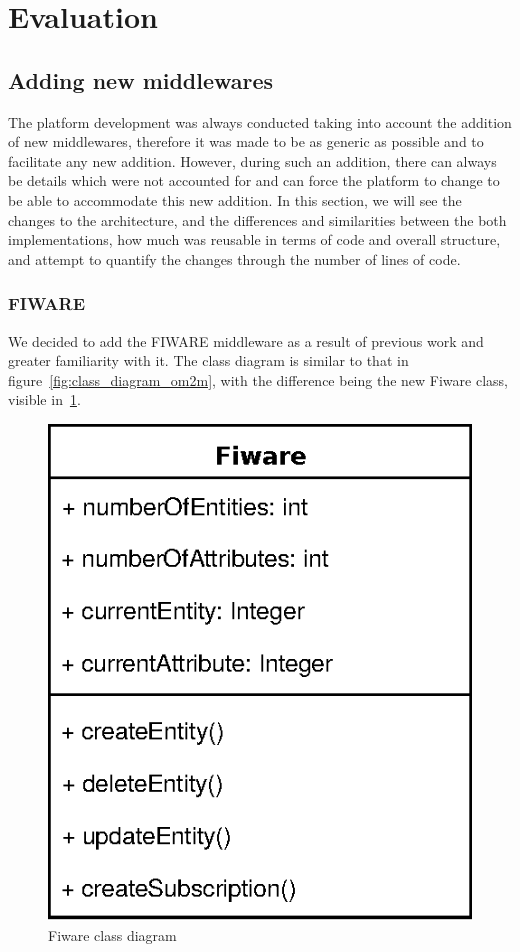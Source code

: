 \documentclass[conference]{IEEEtran}
\begin{document}
\section{Evaluation}

\subsection{Adding new middlewares}

The platform development was always conducted taking into account the addition of new middlewares, therefore it was made to be as generic as possible and to facilitate any new addition. However, during such an addition, there can always be details which were not accounted for and can force the platform to change to be able to accommodate this new addition. In this section, we will see the changes to the architecture, and the differences and similarities between the both implementations, how much was reusable in terms of code and overall structure, and attempt to quantify the changes through the number of lines of code. 

\subsubsection{FIWARE}

We decided to add the FIWARE middleware as a result of previous work and greater familiarity with it. The class diagram is similar to that in figure~\ref{fig:class_diagram_om2m}, with the difference being the new Fiware class, visible in~\ref{fig:class_diagram_fiware}.

\begin{figure}[htbp!]
  \centering
  \includegraphics[width=0.5\columnwidth]{figures/class_diagram_fiware.eps}
  \caption{Fiware class diagram}
  \label{fig:class_diagram_fiware}
\end{figure}
\end{document}

